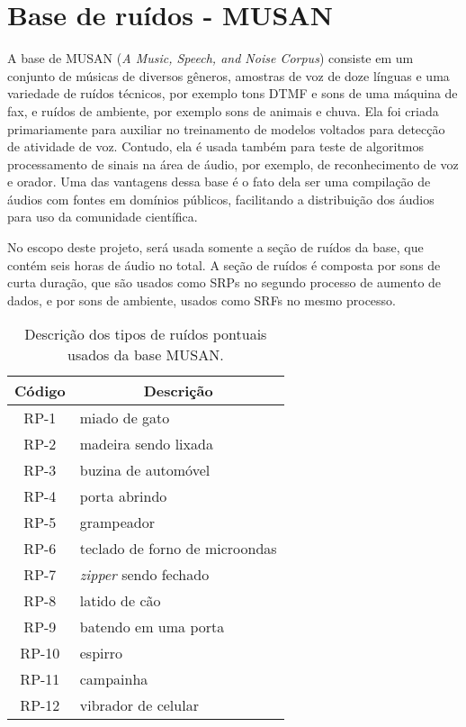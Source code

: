 \section{Base de ruídos - MUSAN}

A base de MUSAN (\textit{A Music, Speech, and Noise Corpus}) \cite{noiseLib} consiste em um conjunto de músicas de diversos gêneros,
amostras de voz de doze línguas e uma variedade de ruídos técnicos, por exemplo tons DTMF e sons de uma máquina de fax, e ruídos de ambiente,
por exemplo sons de animais e chuva.
Ela foi criada primariamente para auxiliar no treinamento de modelos voltados para detecção de atividade de voz. 
Contudo, ela é usada também para teste de algoritmos processamento de sinais na área de áudio, por exemplo, de reconhecimento de voz e orador.
Uma das vantagens dessa base é o fato dela ser uma compilação de áudios com fontes em domínios públicos, facilitando a 
distribuição dos áudios para uso da comunidade científica.

No escopo deste projeto, será usada somente a seção de ruídos da base, que contém seis horas de áudio no total.
A seção de ruídos é composta por sons de curta duração, que são usados como SRPs no segundo processo de 
aumento de dados, e por sons de ambiente, usados como SRFs no mesmo processo.

\begin{table} [H]
    \centering
    \caption{Descrição dos tipos de ruídos pontuais usados da base MUSAN.}
    \label{tbl:noise}
    \begin{tabular}{c|l}

        \multicolumn{1}{c|}{\textbf{Código}} & \multicolumn{1}{c}{\textbf{Descrição}} \\
        \hline 

        RP-1 & miado de gato \\
        RP-2 & madeira sendo lixada \\
        RP-3 & buzina de automóvel \\
        RP-4 & porta abrindo \\
        RP-5 & grampeador \\
        RP-6 & teclado de forno de microondas \\
        RP-7 & \textit{zipper} sendo fechado \\
        RP-8 & latido de cão \\
        RP-9 & batendo em uma porta \\
        RP-10 & espirro \\
        RP-11 & campainha \\
        RP-12 & vibrador de celular \\

    \end{tabular}
\end{table}

